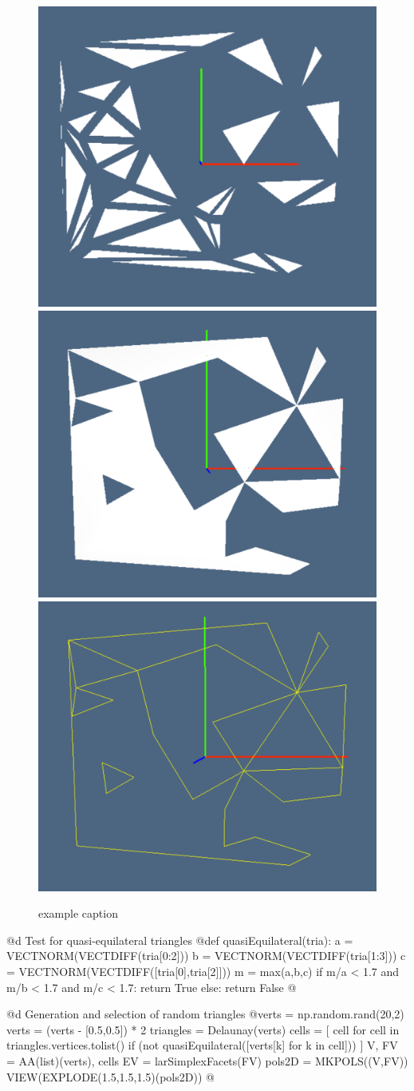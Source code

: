 \documentclass[11pt,oneside]{article}	%
\begin{document}
\begin{figure}[htbp] %
   \centering
   \includegraphics[height=0.25\linewidth,width=0.32\linewidth]{images/tria0} 
   \includegraphics[height=0.25\linewidth,width=0.32\linewidth]{images/tria1} 
   \includegraphics[height=0.25\linewidth,width=0.32\linewidth]{images/tria2} 
   \caption{example caption}
   \label{fig:example}
\end{figure}

@d Test for quasi-equilateral triangles
@{def quasiEquilateral(tria):
    a = VECTNORM(VECTDIFF(tria[0:2]))
    b = VECTNORM(VECTDIFF(tria[1:3]))
    c = VECTNORM(VECTDIFF([tria[0],tria[2]]))
    m = max(a,b,c)
    if m/a < 1.7 and m/b < 1.7 and m/c < 1.7: return True
    else: return False
@}

@d Generation and selection of random triangles 
@{verts = np.random.rand(20,2)
verts = (verts - [0.5,0.5]) * 2
triangles = Delaunay(verts)
cells = [ cell for cell in triangles.vertices.tolist()
         if (not quasiEquilateral([verts[k] for k in cell])) ]
V, FV = AA(list)(verts), cells
EV = larSimplexFacets(FV)
pols2D = MKPOLS((V,FV))
VIEW(EXPLODE(1.5,1.5,1.5)(pols2D))
@}
\end{document}
